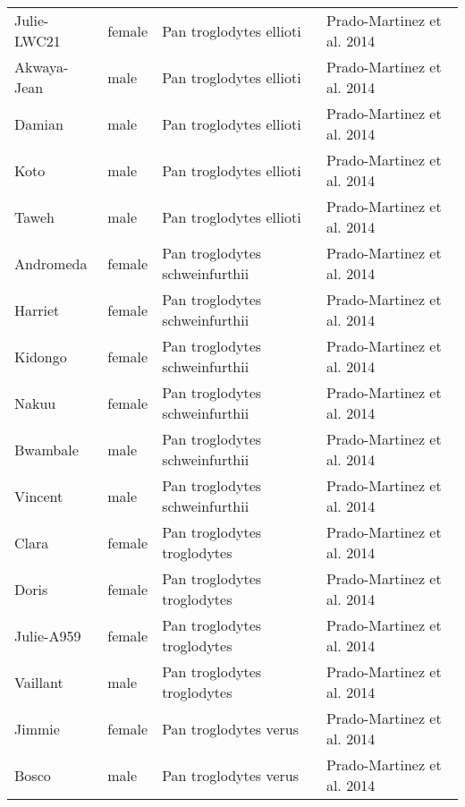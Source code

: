 \begin{table}[h]
\begin{tabular}{|l|l|l|l|}
Julie-LWC21  &  female  &  Pan troglodytes ellioti  & Prado-Martinez et al. 2014  \\
Akwaya-Jean  &  male  &  Pan troglodytes ellioti  & Prado-Martinez et al. 2014  \\
Damian  &  male  &  Pan troglodytes ellioti  & Prado-Martinez et al. 2014  \\
Koto  &  male  &  Pan troglodytes ellioti  & Prado-Martinez et al. 2014  \\
Taweh  &  male  &  Pan troglodytes ellioti  & Prado-Martinez et al. 2014  \\
Andromeda  &  female  &  Pan troglodytes schweinfurthii  & Prado-Martinez et al. 2014  \\
Harriet  &  female  &  Pan troglodytes schweinfurthii  & Prado-Martinez et al. 2014  \\
Kidongo  &  female  &  Pan troglodytes schweinfurthii  & Prado-Martinez et al. 2014  \\
Nakuu  &  female  &  Pan troglodytes schweinfurthii  & Prado-Martinez et al. 2014  \\
Bwambale  &  male  &  Pan troglodytes schweinfurthii  & Prado-Martinez et al. 2014  \\
Vincent  &  male  &  Pan troglodytes schweinfurthii  & Prado-Martinez et al. 2014  \\
Clara  &  female  &  Pan troglodytes troglodytes  & Prado-Martinez et al. 2014  \\
Doris  &  female  &  Pan troglodytes troglodytes  & Prado-Martinez et al. 2014  \\
Julie-A959  &  female  &  Pan troglodytes troglodytes  & Prado-Martinez et al. 2014  \\
Vaillant  &  male  &  Pan troglodytes troglodytes  & Prado-Martinez et al. 2014  \\
Jimmie  &  female  &  Pan troglodytes verus  & Prado-Martinez et al. 2014  \\
Bosco  &  male  &  Pan troglodytes verus  & Prado-Martinez et al. 2014  \\

\end{tabular}
\end{table}
